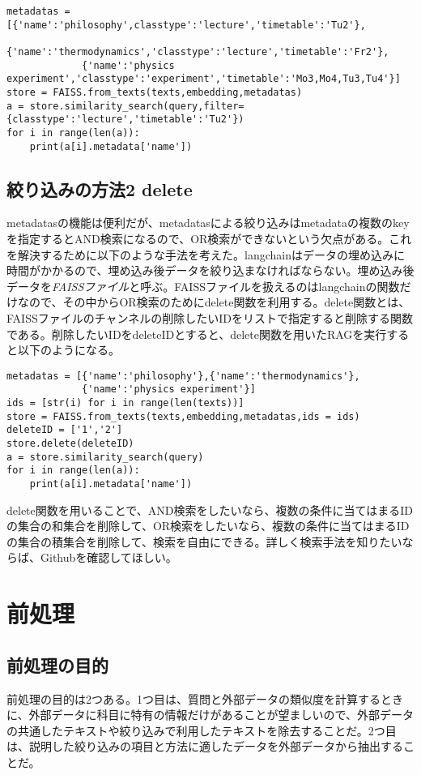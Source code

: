 \begin{lstlisting}[caption=metadatasの例,label=fuga]
metadatas = [{'name':'philosophy',classtype':'lecture','timetable':'Tu2'},
             {'name':'thermodynamics','classtype':'lecture','timetable':'Fr2'},
             {'name':'physics experiment','classtype':'experiment','timetable':'Mo3,Mo4,Tu3,Tu4'}]
store = FAISS.from_texts(texts,embedding,metadatas)
a = store.similarity_search(query,filter={classtype':'lecture','timetable':'Tu2'})
for i in range(len(a)):
    print(a[i].metadata['name'])
\end{lstlisting}

\subsection{絞り込みの方法2 delete}
metadatasの機能は便利だが、metadatasによる絞り込みはmetadataの複数のkeyを指定するとAND検索になるので、OR検索ができないという欠点がある。これを解決するために以下のような手法を考えた。langchainはデータの埋め込みに時間がかかるので、埋め込み後データを絞り込まなければならない。埋め込み後データを\emph{FAISSファイル}と呼ぶ。FAISSファイルを扱えるのはlangchainの関数だけなので、その中からOR検索のためにdelete関数を利用する。delete関数とは、FAISSファイルのチャンネルの削除したいIDをリストで指定すると削除する関数である。削除したいIDをdeleteIDとすると、delete関数を用いたRAGを実行すると以下のようになる。\\

\begin{lstlisting}[caption=deleteの例,label=fuga]
metadatas = [{'name':'philosophy'},{'name':'thermodynamics'},
             {'name':'physics experiment'}]
ids = [str(i) for i in range(len(texts))]
store = FAISS.from_texts(texts,embedding,metadatas,ids = ids)
deleteID = ['1','2']
store.delete(deleteID)
a = store.similarity_search(query)
for i in range(len(a)):
    print(a[i].metadata['name'])
\end{lstlisting}

delete関数を用いることで、AND検索をしたいなら、複数の条件に当てはまるIDの集合の和集合を削除して、OR検索をしたいなら、複数の条件に当てはまるIDの集合の積集合を削除して、検索を自由にできる。詳しく検索手法を知りたいならば、Githubを確認してほしい。\\

\section{前処理}
\subsection{前処理の目的}
前処理の目的は2つある。1つ目は、質問と外部データの類似度を計算するときに、外部データに科目に特有の情報だけがあることが望ましいので、外部データの共通したテキストや絞り込みで利用したテキストを除去することだ。2つ目は、説明した絞り込みの項目と方法に適したデータを外部データから抽出することだ。\\

